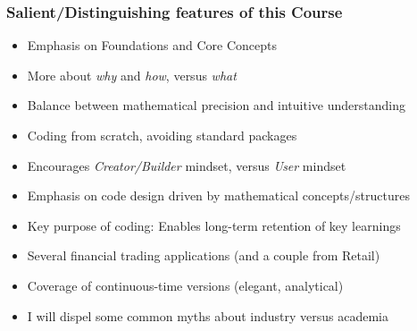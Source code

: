 \documentclass[handout]{beamer}
\begin{document}
\begin{frame}
\frametitle{Salient/Distinguishing features of this Course}
\begin{itemize}[<+->]
\item Emphasis on Foundations and Core Concepts
\item More about {\em why} and {\em how}, versus {\em what}
\item Balance between mathematical precision and intuitive understanding
\item Coding from scratch, avoiding standard packages
\item Encourages {\em Creator/Builder} mindset, versus {\em User} mindset
\item Emphasis on code design driven by mathematical concepts/structures
\item Key purpose of coding: Enables long-term retention of key learnings
\item Several financial trading applications (and a couple from Retail)
\item Coverage of continuous-time versions (elegant, analytical)
\item I will dispel some common myths about industry versus academia
\end{itemize}
\end{frame}
\end{document}
